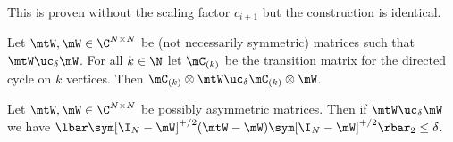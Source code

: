 \documentclass{toc}
\begin{document}
This is proven without the scaling factor $c_{i+1}$ but the construction is identical.

\begin{lemma}  %
\label{app:ucCycle}
Let $\mtW, \mW \in \C^{N\times N}$ be
%
(not necessarily symmetric)  %
matrices such that $\mtW \uc_\delta \mW$. For all $k \in \N$ let $\mC_{(k)}$ be the transition matrix for the directed cycle on $k$ vertices. Then $\mC_{(k)}\otimes\mtW \uc_\delta \mC_{(k)} \otimes \mW$.
\end{lemma}
\begin{lemma} %
\label{app:ucLap}
Let $\mtW, \mW \in \C^{N\times N}$ be possibly asymmetric matrices. Then if $\mtW \uc_\delta \mW$ we have $\lbar\sym[\I_N-\mW]^{+/2}(\mtW-\mW)\sym[\I_N-\mW]^{+/2}\rbar_2\leq \delta$.
\end{lemma}
\end{document}
